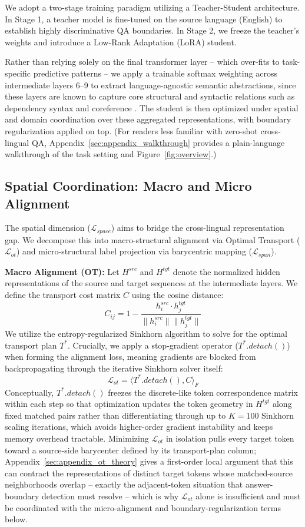 \documentclass[11pt]{article}
\begin{document}
We adopt a two-stage training paradigm utilizing a Teacher-Student architecture. In Stage 1, a teacher model is fine-tuned on the source language (English) to establish highly discriminative QA boundaries. In Stage 2, we freeze the teacher's weights and introduce a Low-Rank Adaptation (LoRA) student. 

Rather than relying solely on the final transformer layer -- which over-fits to task-specific predictive patterns -- we apply a trainable softmax weighting across intermediate layers 6--9 to extract language-agnostic semantic abstractions, since these layers are known to capture core structural and syntactic relations such as dependency syntax and coreference \citep{clark-etal-2019-bert}. The student is then optimized under spatial and domain coordination over these aggregated representations, with boundary regularization applied on top. (For readers less familiar with zero-shot cross-lingual QA, Appendix~\ref{sec:appendix_walkthrough} provides a plain-language walkthrough of the task setting and Figure~\ref{fig:overview}.)

\subsection{Spatial Coordination: Macro and Micro Alignment}
\label{sec:spatial}
The spatial dimension ($\mathcal{L}_{space}$) aims to bridge the cross-lingual representation gap. We decompose this into macro-structural alignment via Optimal Transport ($\mathcal{L}_{ot}$) and micro-structural label projection via barycentric mapping ($\mathcal{L}_{span}$).

\textbf{Macro Alignment (OT):} Let $H^{src}$ and $H^{tgt}$ denote the normalized hidden representations of the source and target sequences at the intermediate layers. We define the transport cost matrix $C$ using the cosine distance:
$$ C_{ij} = 1 - \frac{h^{src}_i \cdot h^{tgt}_j}{\|h^{src}_i\| \|h^{tgt}_j\|} $$
We utilize the entropy-regularized Sinkhorn algorithm to solve for the optimal transport plan $T^*$. Crucially, we apply a stop-gradient operator ($T^*.detach()$) when forming the alignment loss, meaning gradients are blocked from backpropagating through the iterative Sinkhorn solver itself:
$$ \mathcal{L}_{ot} = \langle T^*.detach(), C \rangle_F $$
Conceptually, $T^*.detach()$ freezes the discrete-like token correspondence matrix within each step so that optimization updates the token geometry in $H^{tgt}$ along fixed matched pairs rather than differentiating through up to $K=100$ Sinkhorn scaling iterations, which avoids higher-order gradient instability and keeps memory overhead tractable.
Minimizing $\mathcal{L}_{ot}$ in isolation pulls every target token toward a source-side barycenter defined by its transport-plan column; Appendix~\ref{sec:appendix_ot_theory} gives a first-order local argument that this can contract the representations of distinct target tokens whose matched-source neighborhoods overlap -- exactly the adjacent-token situation that answer-boundary detection must resolve -- which is why $\mathcal{L}_{ot}$ alone is insufficient and must be coordinated with the micro-alignment and boundary-regularization terms below.
\end{document}
